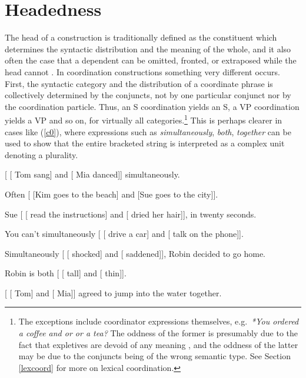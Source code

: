 \documentclass[output=paper
                ,modfonts
                ,nonflat
	        ,collection
	        ,collectionchapter
	        ,collectiontoclongg
 	        ,biblatex
                ,babelshorthands
                ,newtxmath
                ,draftmode
                ,colorlinks, citecolor=brown
]{./langsci/langscibook}
\begin{document}
\section{Headedness}
\label{coord-sec-headedness}

The head of a construction is traditionally defined as the constituent which determines the syntactic distribution and the meaning of the whole, and it also often the case that a dependent can be omitted, fronted, or extraposed while the head cannot \citep{zwicky85}. In coordination constructions something very different occurs. First, the syntactic category and the distribution of a coordinate phrase is collectively determined by the conjuncts, not by one particular conjunct nor by the coordination particle. Thus, an S coordination yields an S, a VP coordination yields a VP and so on, for virtually all categories.\footnote{The exceptions include coordinator expressions themselves, e.g.\ \emph{*You ordered a coffee and or or a tea?} The oddness of the former is presumably due to the fact that expletives are devoid of any meaning
\citep{MuellerGT-Eng0}, and the oddness of the latter may be due to the conjuncts being of the wrong semantic type. See Section \ref{lexcoord} for more on lexical coordination.}
This is perhaps clearer in cases like (\ref{c0}), where
expressions such as \emph{simultaneously}, \emph{both}, 
\emph{together} can be used to show that the entire bracketed string
is interpreted as a complex unit denoting a plurality.


\begin{exe}
\ex
\begin{xlista}
\ex{} [ [ Tom sang] and [ Mia danced]] simultaneously.

\ex{} Often [ [Kim goes to the beach] and [Sue goes to the city]].

\ex{} Sue [ [ read the instructions] and [ dried her hair]], in twenty seconds.

\ex{} You can't simultaneously [ [ drive a car] and [ talk on the phone]].

\ex{} Simultaneously [ [ shocked] and [ saddened]], Robin decided to go home.

\ex Robin is both [ [ tall] and [ thin]].

\ex{} [ [ Tom] and [ Mia]] agreed to jump into the water together.

\end{xlista}\label{c0}
\end{exe}
\end{document}
